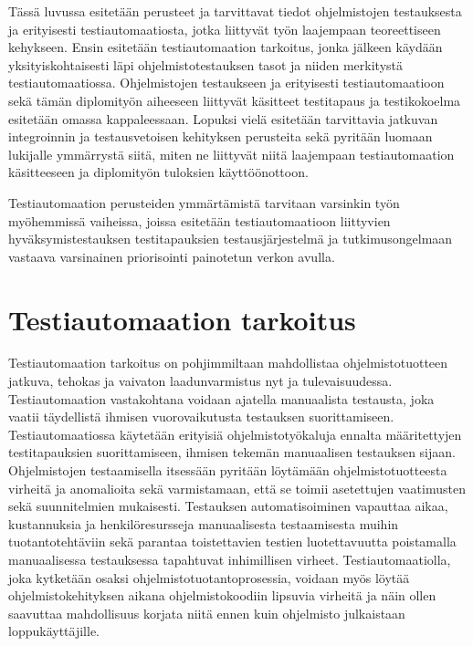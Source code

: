 Tässä luvussa esitetään perusteet ja tarvittavat tiedot ohjelmistojen testauksesta ja erityisesti testiautomaatiosta, jotka liittyvät työn laajempaan teoreettiseen kehykseen.
Ensin esitetään testiautomaation tarkoitus, jonka jälkeen käydään yksityiskohtaisesti läpi ohjelmistotestauksen tasot ja niiden merkitystä testiautomaatiossa.
Ohjelmistojen testaukseen ja erityisesti testiautomaatioon sekä tämän diplomityön aiheeseen liittyvät käsitteet testitapaus ja testikokoelma esitetään omassa kappaleessaan.
Lopuksi vielä esitetään tarvittavia jatkuvan integroinnin ja testausvetoisen kehityksen perusteita sekä pyritään luomaan lukijalle ymmärrystä siitä, miten ne liittyvät niitä laajempaan testiautomaation käsitteeseen ja diplomityön tuloksien käyttöönottoon.

Testiautomaation perusteiden ymmärtämistä tarvitaan varsinkin työn myöhemmissä vaiheissa, joissa esitetään testiautomaatioon liittyvien hyväksymistestauksen testitapauksien testausjärjestelmä ja tutkimusongelmaan vastaava varsinainen priorisointi painotetun verkon avulla.

\section{Testiautomaation tarkoitus} \label{ch:07_testiautomaation_tarkoitus}

  Testiautomaation tarkoitus on pohjimmiltaan mahdollistaa ohjelmistotuotteen jatkuva, tehokas ja vaivaton laadunvarmistus nyt ja tulevaisuudessa.
  Testiautomaation vastakohtana voidaan ajatella manuaalista testausta, joka vaatii täydellistä ihmisen vuorovaikutusta testauksen suorittamiseen.
  Testiautomaatiossa käytetään erityisiä ohjelmistotyökaluja ennalta määritettyjen testitapauksien suorittamiseen, ihmisen tekemän manuaalisen testauksen sijaan.
  Ohjelmistojen testaamisella itsessään pyritään löytämään ohjelmistotuotteesta virheitä ja anomalioita sekä varmistamaan, että se toimii asetettujen vaatimusten sekä suunnitelmien mukaisesti.
  Testauksen automatisoiminen vapauttaa aikaa, kustannuksia ja henkilöresursseja manuaalisesta testaamisesta muihin tuotantotehtäviin sekä parantaa toistettavien testien luotettavuutta poistamalla manuaalisessa testauksessa tapahtuvat inhimillisen virheet.
  Testiautomaatiolla, joka kytketään osaksi ohjelmistotuotantoprosessia, voidaan myös löytää ohjelmistokehityksen aikana ohjelmistokoodiin lipsuvia virheitä ja näin ollen saavuttaa mahdollisuus korjata niitä ennen kuin ohjelmisto julkaistaan loppukäyttäjille.

